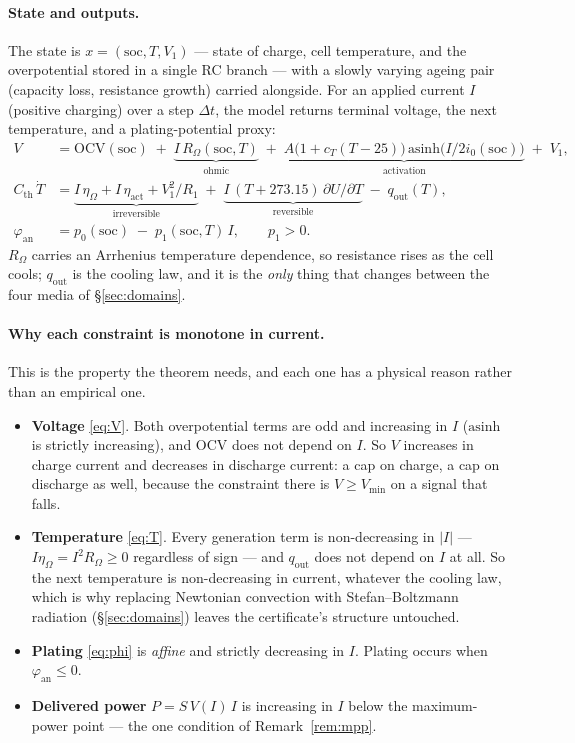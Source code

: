 \documentclass[11pt,letterpaper]{article}
\theoremstyle{definition}
\theoremstyle{remark}
\begin{document}
\paragraph{State and outputs.} The state is $x = (\mathrm{soc}, T, V_1)$ --- state of charge,
cell temperature, and the overpotential stored in a single RC branch --- with a slowly varying
ageing pair (capacity loss, resistance growth) carried alongside. For an applied current $I$
(positive charging) over a step $\Delta t$, the model returns terminal voltage, the next
temperature, and a plating-potential proxy:
\begin{align}
V &= \mathrm{OCV}(\mathrm{soc}) \;+\; \underbrace{I\,R_\Omega(\mathrm{soc},T)}_{\text{ohmic}}
   \;+\; \underbrace{A\big(1+c_T (T-25)\big)\,\mathrm{asinh}\!\big(I/2i_0(\mathrm{soc})\big)}_{\text{activation}}
   \;+\; V_1, \label{eq:V}\\[2pt]
C_{\mathrm{th}}\,\dot T &= \underbrace{I\,\eta_\Omega + I\,\eta_{\mathrm{act}}
   + V_1^2/R_1}_{\text{irreversible}} \;+\; \underbrace{I\,(T+273.15)\,\partial U/\partial T}_{\text{reversible}}
   \;-\; q_{\mathrm{out}}(T), \label{eq:T}\\[2pt]
\varphi_{\mathrm{an}} &= p_0(\mathrm{soc}) \;-\; p_1(\mathrm{soc},T)\,I, \qquad p_1 > 0.
\label{eq:phi}
\end{align}
$R_\Omega$ carries an Arrhenius temperature dependence, so resistance rises as the cell cools;
$q_{\mathrm{out}}$ is the cooling law, and it is the \emph{only} thing that changes between the
four media of \S\ref{sec:domains}.

\paragraph{Why each constraint is monotone in current.} This is the property the theorem needs,
and each one has a physical reason rather than an empirical one.
\begin{itemize}\itemsep1pt
\item \textbf{Voltage} \eqref{eq:V}. Both overpotential terms are odd and increasing in $I$
($\mathrm{asinh}$ is strictly increasing), and $\mathrm{OCV}$ does not depend on $I$. So $V$
increases in charge current and decreases in discharge current: a cap on charge, a cap on
discharge as well, because the constraint there is $V \ge V_{\min}$ on a signal that falls.
\item \textbf{Temperature} \eqref{eq:T}. Every generation term is non-decreasing in $|I|$ ---
$I\eta_\Omega = I^2 R_\Omega \ge 0$ regardless of sign --- and $q_{\mathrm{out}}$ does not
depend on $I$ at all. So the next temperature is non-decreasing in current, whatever the cooling
law, which is why replacing Newtonian convection with Stefan--Boltzmann radiation
(\S\ref{sec:domains}) leaves the certificate's structure untouched.
\item \textbf{Plating} \eqref{eq:phi} is \emph{affine} and strictly decreasing in $I$. Plating
occurs when $\varphi_{\mathrm{an}} \le 0$.
\item \textbf{Delivered power} $P = S\,V(I)\,I$ is increasing in $I$ below the maximum-power
point --- the one condition of Remark~\ref{rem:mpp}.
\end{itemize}
\end{document}
